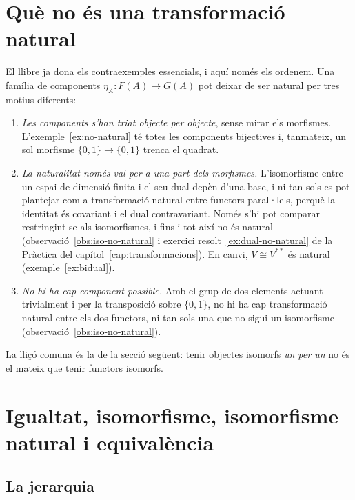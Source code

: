 \section{Què no és una transformació natural}
\label{sec:no-natural}

El llibre ja dona els contraexemples essencials, i aquí només els ordenem. Una família de components $\eta_A\colon F(A)\to G(A)$ pot deixar de ser natural per tres motius diferents:
\begin{enumerate}
\item \emph{Les components s'han triat objecte per objecte}, sense mirar els morfismes. L'exemple~\ref{ex:no-natural} té totes les components bijectives i, tanmateix, un sol morfisme $\{0,1\}\to\{0,1\}$ trenca el quadrat.
\item \emph{La naturalitat només val per a una part dels morfismes.} L'isomorfisme entre un espai de dimensió finita i el seu dual depèn d'una base, i ni tan sols es pot plantejar com a transformació natural entre functors paral·lels, perquè la identitat és covariant i el dual contravariant. Només s'hi pot comparar restringint-se als isomorfismes, i fins i tot així no és natural (observació~\ref{obs:iso-no-natural} i exercici resolt~\ref{ex:dual-no-natural} de la Pràctica del capítol~\ref{cap:transformacions}). En canvi, $V\cong V^{**}$ és natural (exemple~\ref{ex:bidual}).
\item \emph{No hi ha cap component possible.} Amb el grup de dos elements actuant trivialment i per la transposició sobre $\{0,1\}$, no hi ha cap transformació natural entre els dos functors, ni tan sols una que no sigui un isomorfisme (observació~\ref{obs:iso-no-natural}).
\end{enumerate}
La lliçó comuna és la de la secció següent: tenir objectes isomorfs \emph{un per un} no és el mateix que tenir functors isomorfs.

\section{Igualtat, isomorfisme, isomorfisme natural i equivalència}
\label{sec:igualtat-equivalencia}

\subsection{La jerarquia}

